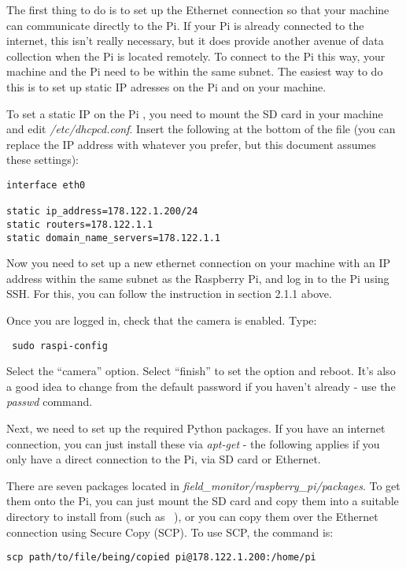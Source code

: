 \documentclass[10pt]{article}
\begin{document}
The first thing to do is to set up the Ethernet connection so that your machine can communicate directly to the Pi. If your Pi is already connected to the internet, this
isn't really necessary, but it does provide another avenue of data collection when the Pi is located remotely. To connect to the Pi this way, your machine and the Pi 
need to be within the same subnet. The easiest way to do this is to set up static IP adresses on the Pi and on your machine.

To set a static IP on the Pi , you need to mount the SD card in your machine and edit \textit{/etc/dhcpcd.conf}. Insert the following at the bottom of the file (you can 
replace the IP address with whatever you prefer, but this document assumes these settings):

\begin{verbatim}
interface eth0

static ip_address=178.122.1.200/24
static routers=178.122.1.1
static domain_name_servers=178.122.1.1
\end{verbatim}

Now you need to set up a new ethernet connection on your machine with an IP address within the same subnet as the Raspberry Pi, and log in to the Pi using SSH. For this, you can follow the instruction in section 2.1.1 above.

Once you are logged in, check that the camera is enabled. Type:

\begin{verbatim}
 sudo raspi-config
\end{verbatim}

Select the ``camera'' option. Select ``finish'' to set the option and reboot. It's also a good idea to change from the default password if you haven't already - 
use the \textit{passwd} command. 

Next, we need to set up the required Python packages. If you have an internet connection, you can just install these via \textit{apt-get} - the following applies if 
you only have a direct connection to the Pi, via SD card or Ethernet.

There are seven packages located in \textit{field\_monitor/raspberry\_pi/packages}. To get them onto the Pi, you can just mount the SD card
and copy them into a suitable directory to install from (such as ~), or you can copy them over the Ethernet connection using Secure Copy (SCP). To use SCP, the 
command is:

\begin{verbatim}
scp path/to/file/being/copied pi@178.122.1.200:/home/pi
\end{verbatim}
\end{document}
